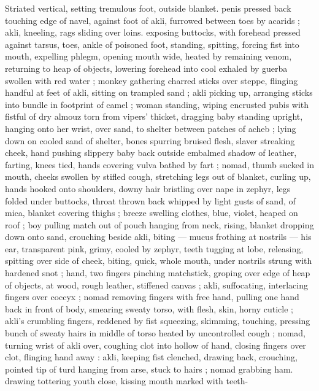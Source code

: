 Striated vertical, setting tremulous foot, outside blanket. penis 
pressed back touching edge of navel, against foot of akli, furrowed 
between toes by acarids ; akli, kneeling, rags sliding over loins. 
exposing buttocks, with forehead pressed against tarsus, toes, ankle 
of poisoned foot, standing, spitting, forcing fist into mouth, expelling 
phlegm, opening mouth wide, heated by remaining venom, returning 
to heap of objects, lowering forehead into cool exhaled by guerba 
swollen with red water ; monkey gathering charred sticks over 
steppe, flinging handful at feet of akli, sitting on trampled sand ; akli 
picking up, arranging sticks into bundle in footprint of camel ; woman 
standing, wiping encrusted pubis with fistful of dry almouz torn from 
vipers' thicket, dragging baby standing upright, hanging onto her 
wrist, over sand, to shelter between patches of acheb ; lying down on 
cooled sand of shelter, bones spurring bruised flesh, slaver 
streaking cheek, hand pushing slippery baby back outside embalmed 
shadow of leather, farting, knees tied, hands covering vulva bathed 
by fart ; nomad, thumb sucked in mouth, cheeks swollen by stifled 
cough, stretching legs out of blanket, curling up, hands hooked onto 
shoulders, downy hair bristling over nape in zephyr, legs folded 
under buttocks, throat thrown back whipped by light gusts of sand, 
of mica, blanket covering thighs ; breeze swelling clothes, blue, 
violet, heaped on roof ; boy pulling match out of pouch hanging from 
neck, rising, blanket dropping down onto sand, crouching beside akli, 
biting --- mucus frothing at nostrils --- his ear, transparent pink, 
grimy, cooled by zephyr, teeth tugging at lobe, releasing, spitting 
over side of cheek, biting, quick, whole mouth, under nostrils strung 
with hardened snot ; hand, two fingers pinching matchstick, groping 
over edge of heap of objects, at wood, rough leather, stiffened 
canvas ; akli, suffocating, interlacing fingers over coccyx ; nomad 
removing fingers with free hand, pulling one hand back in front of 
body, smearing sweaty torso, with flesh, skin, horny cuticle ; akli's 
crumbling fingers, reddened by fist squeezing, skimming, touching, 
pressing bunch of sweaty hairs in middle of torso heated by 
uncontrolled cough ; nomad, turning wrist of akli over, coughing clot 
into hollow of hand, closing fingers over clot, flinging hand away : 
akli, keeping fist clenched, drawing back, crouching, pointed tip of 
turd hanging from arse, stuck to hairs ; nomad grabbing ham. 
drawing tottering youth close, kissing mouth marked with teeth- 
